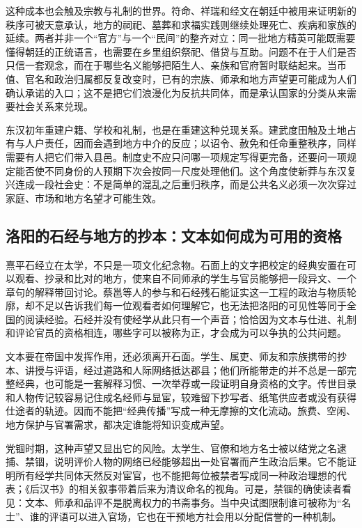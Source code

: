 这种成本也会触及宗教与礼制的世界。符命、祥瑞和经文在朝廷中被用来证明新的秩序可被天意承认，地方的祠祀、墓葬和求福实践则继续处理死亡、疾病和家族的延续。两者并非一个“官方”与一个“民间”的整齐对立：同一批地方精英可能既需要懂得朝廷的正统语言，也需要在乡里组织祭祀、借贷与互助。问题不在于人们是否只信一套观念，而在于哪些名义能够把陌生人、亲族和官府暂时联结起来。当币值、官名和政治归属都反复改变时，已有的宗族、师承和地方声望更可能成为人们确认承诺的入口；这不是把它们浪漫化为反抗共同体，而是承认国家的分类从来需要社会关系来兑现。

东汉初年重建户籍、学校和礼制，也是在重建这种兑现关系。建武度田触及土地占有与人户责任，因而会遇到地方中介的反应；以诏令、赦免和任命重整秩序，同样需要有人把它们带入县邑。制度史不应只问哪一项规定写得更完备，还要问一项规定能否使不同身份的人预期下次会按同一尺度处理他们。这个角度使新莽与东汉复兴连成一段社会史：不是简单的混乱之后重归秩序，而是公共名义必须一次次穿过家庭、市场和地方名望才可能生效。

\subsection{洛阳的石经与地方的抄本：文本如何成为可用的资格}

熹平石经立在太学，不只是一项文化纪念物。石面上的文字把校定的经典安置在可以观看、抄录和比对的地方，使来自不同师承的学生与官员能够把一段异文、一个章句的解释带回讨论。蔡邕等人的参与和石经残石能证实这一工程的政治与物质轮廓，却不足以告诉我们每一位观看者如何理解它，也无法把洛阳的可见性等同于全国的阅读经验。石经并没有使经学从此只有一个声音；恰恰因为文本与仕进、礼制和评论官员的资格相连，哪些字可以被称为正，才会成为可以争执的公共问题。

文本要在帝国中发挥作用，还必须离开石面。学生、属吏、师友和宗族携带的抄本、讲授与评语，经过道路和人际网络抵达郡县；他们所能带走的并不总是一部完整经典，也可能是一套解释习惯、一次举荐或一段证明自身资格的文字。传世目录和人物传记较容易记住成名经师与显宦，较难留下抄写者、纸笔供应者或没有获得仕途者的轨迹。因而不能把“经典传播”写成一种无摩擦的文化流动。旅费、空闲、地方保护与官署需求，都决定谁能将知识变成声望。

党锢时期，这种声望又显出它的风险。太学生、官僚和地方名士被以结党之名逮捕、禁锢，说明评价人物的网络已经能够超出一处官署而产生政治后果。它不能证明所有经学共同体天然反对宦官，也不能把每位被禁者写成同一种政治理想的代表；《后汉书》的相关叙事带着后来为清议命名的视角。可是，禁锢的确使读者看见：文本、师承和品评不是脱离权力的书斋事务。当中央试图限制谁可被称为“名士”、谁的评语可以进入官场，它也在干预地方社会用以分配信誉的一种机制。

